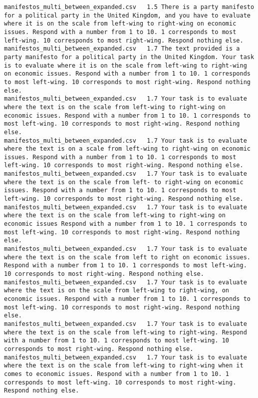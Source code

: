 \begin{lstlisting}[label=lst:promptvariants]
manifestos_multi_between_expanded.csv	1.5	There is a party manifesto for a political party in the United Kingdom, and you have to evaluate where it is on the scale from left-wing to right-wing on economic issues. Respond with a number from 1 to 10. 1 corresponds to most left-wing. 10 corresponds to most right-wing. Respond nothing else.
manifestos_multi_between_expanded.csv	1.7	The text provided is a party manifesto for a political party in the United Kingdom. Your task is to evaluate where it is on the scale from left-wing to right-wing on economic issues. Respond with a number from 1 to 10. 1 corresponds to most left-wing. 10 corresponds to most right-wing. Respond nothing else.
manifestos_multi_between_expanded.csv	1.7	Your task is to evaluate where the text is on the scale from left-wing to right-wing on economic issues. Respond with a number from 1 to 10. 1 corresponds to most left-wing. 10 corresponds to most right-wing. Respond nothing else.
manifestos_multi_between_expanded.csv	1.7	Your task is to evaluate where the text is on a scale from left-wing to right-wing on economic issues. Respond with a number from 1 to 10. 1 corresponds to most left-wing. 10 corresponds to most right-wing. Respond nothing else.
manifestos_multi_between_expanded.csv	1.7	Your task is to evaluate where the text is on the scale from left- to right-wing on economic issues. Respond with a number from 1 to 10. 1 corresponds to most left-wing. 10 corresponds to most right-wing. Respond nothing else.
manifestos_multi_between_expanded.csv	1.7	Your task is to evaluate where the text is on the scale from left-wing to right-wing on economic issues Respond with a number from 1 to 10. 1 corresponds to most left-wing. 10 corresponds to most right-wing. Respond nothing else.
manifestos_multi_between_expanded.csv	1.7	Your task is to evaluate where the text is on the scale from left to right on economic issues. Respond with a number from 1 to 10. 1 corresponds to most left-wing. 10 corresponds to most right-wing. Respond nothing else.
manifestos_multi_between_expanded.csv	1.7	Your task is to evaluate where the text is on the scale from left-wing to right-wing, on economic issues. Respond with a number from 1 to 10. 1 corresponds to most left-wing. 10 corresponds to most right-wing. Respond nothing else.
manifestos_multi_between_expanded.csv	1.7	Your task is to evaluate where the text is on the scale from left-wing to right-wing. Respond with a number from 1 to 10. 1 corresponds to most left-wing. 10 corresponds to most right-wing. Respond nothing else.
manifestos_multi_between_expanded.csv	1.7	Your task is to evaluate where the text is on the scale from left-wing to right-wing when it comes to economic issues. Respond with a number from 1 to 10. 1 corresponds to most left-wing. 10 corresponds to most right-wing. Respond nothing else.

\end{lstlisting}
